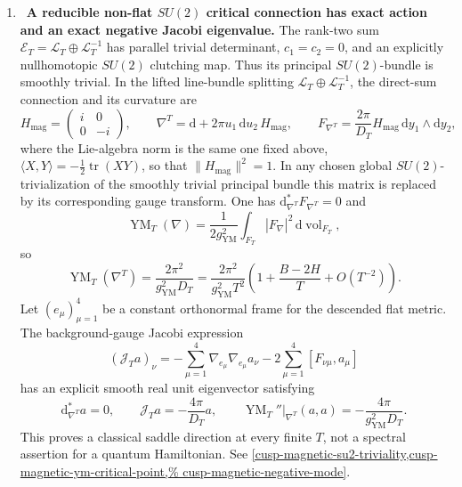 \begin{enumerate}[leftmargin=1.8em,itemsep=.65em]
\item \Verified\ \textbf{A reducible non-flat \(SU(2)\) critical
connection has exact action and an exact negative Jacobi eigenvalue.}
The rank-two sum
\(\mathscr E_T=\mathscr L_T\oplus\mathscr L_T^{-1}\) has parallel trivial
determinant, \(c_1=c_2=0\), and an explicitly nullhomotopic
\(SU(2)\) clutching map.  Thus its principal \(SU(2)\)-bundle is
smoothly trivial.  In the lifted line-bundle splitting
\(\mathscr L_T\oplus\mathscr L_T^{-1}\), the direct-sum connection and its
curvature are
\[
 H_{\mathrm{mag}}=\begin{pmatrix}i&0\\0&-i\end{pmatrix},\qquad
 \nabla^T=\mathrm d+2\pi u_1\,\mathrm du_2\,H_{\mathrm{mag}},\qquad
 F_{\nabla^T}=\frac{2\pi}{D_T}H_{\mathrm{mag}}\,
 \mathrm dy_1\wedge\mathrm dy_2,
\]
where the Lie-algebra norm is the same one fixed above,
\(\langle X,Y\rangle=-\tfrac12\operatorname{tr}(XY)\), so that
\(\lVert H_{\mathrm{mag}}\rVert^2=1\).
In any chosen global \(SU(2)\)-trivialization of the smoothly trivial
principal bundle this matrix is replaced by its corresponding gauge
transform.  One has \(\mathrm d_{\nabla^T}^*F_{\nabla^T}=0\) and
\[
 \operatorname{YM}_T(\nabla)
 =\frac1{2g_{\mathrm{YM}}^2}
  \int_{F_T}|F_\nabla|^2\,\mathrm d\operatorname{vol}_{F_T},
\]
so
\[
 \operatorname{YM}_T(\nabla^T)
 =\frac{2\pi^2}{g_{\mathrm{YM}}^2D_T}
 =\frac{2\pi^2}{g_{\mathrm{YM}}^2T^2}
 \left(1+\frac{B-2H}{T}+O(T^{-2})\right).
\]
Let \((e_\mu)_{\mu=1}^4\) be a constant orthonormal frame for the descended
flat metric.  The background-gauge Jacobi expression
\[
 (\mathcal J_Ta)_\nu
 =-\sum_{\mu=1}^4\nabla_{e_\mu}\nabla_{e_\mu}a_\nu
  -2\sum_{\mu=1}^4[F_{\nu\mu},a_\mu]
\]
has an explicit smooth real unit eigenvector satisfying
\[
 \mathrm d_{\nabla^T}^*a=0,\qquad
 \mathcal J_Ta=-\frac{4\pi}{D_T}a,\qquad
 \operatorname{YM}_T''|_{\nabla^T}(a,a)
 =-\frac{4\pi}{g_{\mathrm{YM}}^2D_T}.
\]
This proves a classical saddle direction at every finite \(T\), not a
spectral assertion for a quantum Hamiltonian.  See
\cref{cusp-magnetic-su2-triviality,cusp-magnetic-ym-critical-point,%
cusp-magnetic-negative-mode}.


\end{enumerate}
